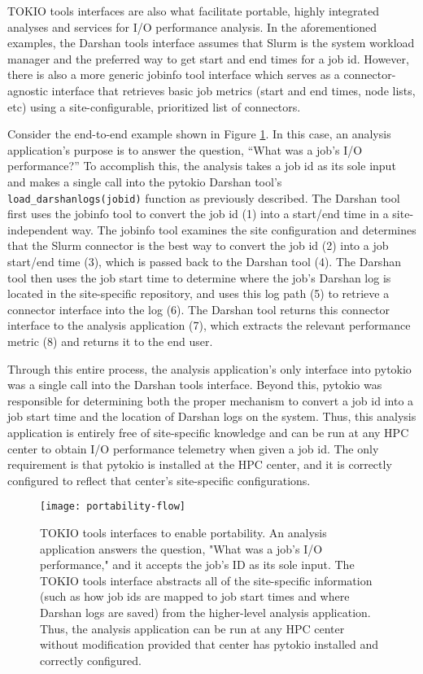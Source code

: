 TOKIO tools interfaces are also what facilitate portable, highly integrated analyses and services for I/O performance analysis.
In the aforementioned examples, the Darshan tools interface assumes that Slurm is the system workload manager and the preferred way to get start and end times for a job id.
However, there is also a more generic jobinfo tool interface which serves as a connector-agnostic interface that retrieves basic job metrics (start and end times, node lists, etc) using a site-configurable, prioritized list of connectors.

Consider the end-to-end example shown in Figure \ref{fig:portability-flow}.  
In this case, an analysis application's purpose is to answer the question, ``What was a job's I/O performance?''
To accomplish this, the analysis takes a job id as its sole input and makes a single call into the pytokio Darshan tool's \texttt{load\_darshanlogs(jobid)} function as previously described.
The Darshan tool first uses the jobinfo tool to convert the job id (1) into a start/end time in a site-independent way.
The jobinfo tool examines the site configuration and determines that the Slurm connector is the best way to convert the job id (2) into a job start/end time (3), which is passed back to the Darshan tool (4).
The Darshan tool then uses the job start time to determine where the job's Darshan log is located in the site-specific repository, and uses this log path (5) to retrieve a connector interface into the log (6).
The Darshan tool returns this connector interface to the analysis application (7), which extracts the relevant performance metric (8) and returns it to the end user.

Through this entire process, the analysis application's only interface into pytokio was a single call into the Darshan tools interface.
Beyond this, pytokio was responsible for determining both the proper mechanism to convert a job id into a job start time and the location of Darshan logs on the system.
Thus, this analysis application is entirely free of site-specific knowledge and can be run at any HPC center to obtain I/O performance telemetry when given a job id.
The only requirement is that pytokio is installed at the HPC center, and it is correctly configured to reflect that center's site-specific configurations.

\begin{figure}
    \centering
    \texttt{[image: portability-flow]}
    \caption{TOKIO tools interfaces to enable portability.
    An analysis application answers the question, "What was a job's I/O performance," and it accepts the job's ID as its sole input.
    The TOKIO tools interface abstracts all of the site-specific information (such as how job ids are mapped to job start times and where Darshan logs are saved) from the higher-level analysis application.
    Thus, the analysis application can be run at any HPC center without modification provided that center has pytokio installed and correctly configured.
    }
    \label{fig:portability-flow}
    \vspace{-.2in}
\end{figure}
